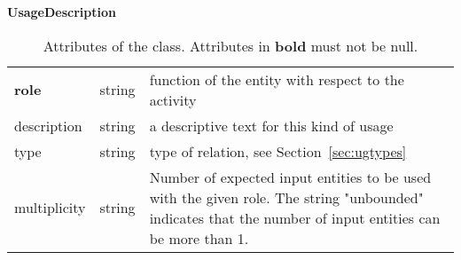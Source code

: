 \begin{table}[ht]
\small
{}\textwidth
\textbf{\normalsize UsageDescription}\vspace{0.25em}\\
\begin{tabulary}{1.0\textwidth}{llL}
\toprule
{} &   & \\
\midrule
\textbf{role} & string   & function of the entity with respect to the activity \\
description  & string & a descriptive text for this kind of usage \\
type    & string   & type of relation, see Section~\ref{sec:ugtypes} \\
multiplicity & string & Number of expected input entities to be used with the given role. The string "unbounded" indicates that the number of input entities can be more than 1. \\
\bottomrule
\end{tabulary}
\caption[Attributes of the  class]{Attributes of the  class. Attributes in \textbf{bold} must not be null.}
\label{tab:usagedescription}
\end{table}


